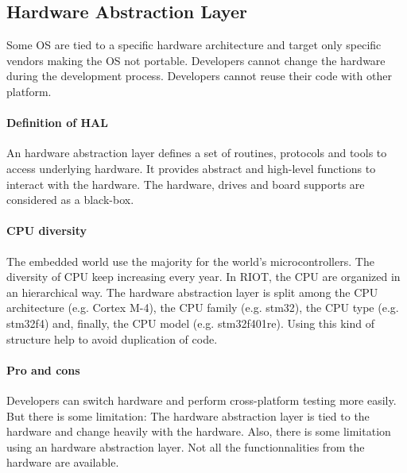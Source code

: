 \subsection{Hardware Abstraction Layer}
Some OS are tied to a specific hardware architecture and target only specific vendors making the OS not portable.
Developers cannot change the hardware during the development process.
Developers cannot reuse their code with other platform.

\paragraph{Definition of HAL}
An hardware abstraction layer defines a set of routines, protocols and tools to access underlying hardware.
It provides abstract and high-level functions to interact with the hardware.
The hardware, drives and board supports are considered as a black-box.


\paragraph{CPU diversity}
The embedded world use the majority for the world's microcontrollers.
The diversity of CPU keep increasing every year.
In RIOT, the CPU are organized in an hierarchical way.
The hardware abstraction layer is split among the CPU architecture (e.g. Cortex M-4), the CPU family (e.g. stm32), the CPU type (e.g. stm32f4) and, finally, the CPU model (e.g. stm32f401re).
Using this kind of structure help to avoid duplication of code.

\paragraph{Pro and cons}
Developers can switch hardware and perform cross-platform testing more easily.
But there is some limitation: The hardware abstraction layer is tied to the hardware and change heavily with the hardware.
Also, there is some limitation using an hardware abstraction layer.
Not all the functionnalities from the hardware are available.